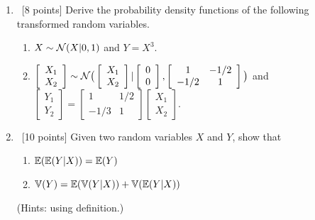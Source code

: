 \documentclass[12pt, fullpage,letterpaper]{article}
\begin{document}
\begin{enumerate}
\item~[8 points] Derive the probability density functions of the following transformed random variables. 
\begin{enumerate}
	\item $X \sim \mathcal{N}(X|0, 1)$ and $Y = X^3$.
	\item $\left[\begin{array}{c}X_1 \\ X_2\end{array}\right] \sim \mathcal{N}\big(\left[\begin{array}{c}X_1 \\ X_2\end{array}\right]|\left[\begin{array}{c}0 \\ 0 \end{array}\right], \left[\begin{array}{cc}1 & -1/2 \\ -1/2 & 1\end{array}\right]\big)$ and $\left[\begin{array}{c}Y_1 \\ Y_2\end{array}\right] = \left[\begin{array}{cc}1 & 1/2\\-1/3&1\end{array}\right]\left[\begin{array}{c}X_1 \\ X_2\end{array}\right]$.
\end{enumerate}

\item~[10 points]  Given two random variables $X$ and $Y$, show that 
\begin{enumerate}
\item $\mathbb{E}(\mathbb{E}(Y|X)) = \mathbb{E}(Y)$
\item
$\mathbb{V}(Y) = \mathbb{E}(\mathbb{V}(Y|X)) + \mathbb{V}(\mathbb{E}(Y|X))$
\end{enumerate}
(Hints: using definition.)



\end{enumerate}
\end{document}
